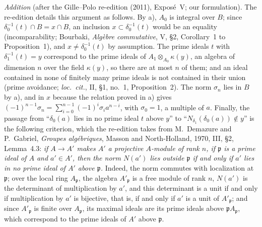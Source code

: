 \par\medskip\noindent
\emph{Addition} (after the Gille--Polo re-edition (2011), Exposé~V; our
formulation). The re-edition details this argument as follows. By a),
\(A_0\) is integral over \(B\); since \(\delta_0^{-1}(t)\cap B=x\cap B\), an
inclusion \(x\subset\delta_0^{-1}(t)\) would be an equality (incomparability;
Bourbaki, \emph{Algèbre commutative}, V, \S2, Corollary~1 to
Proposition~1), and \(x\neq\delta_0^{-1}(t)\) by assumption. The prime ideals
\(t\) with \(\delta_1^{-1}(t)=y\) correspond to the prime ideals of
\(A_1\otimes_{A_0}\kappa(y)\), an algebra of dimension \(n\) over the field
\(\kappa(y)\), so there are at most \(n\) of them; and an ideal contained in
none of finitely many prime ideals is not contained in their union (prime
avoidance; \emph{loc.\ cit.}, II, \S1, no.~1, Proposition~2). The norm
\(\sigma_n\) lies in \(B\) by a), and in \(x\) because the relation proved in
a) gives \((-1)^{n-1}\sigma_n=\sum_{i=0}^{n-1}(-1)^i\sigma_ia^{n-i}\), with
\(\sigma_0=1\), a multiple of \(a\). Finally, the passage from
``\(\delta_0(a)\) lies in no prime ideal \(t\) above \(y\)'' to
``\(N_{\delta_1}(\delta_0(a))\notin y\)'' is the following criterion, which the
re-edition takes from M.~Demazure and P.~Gabriel, \emph{Groupes
algébriques}, Masson and North-Holland, 1970, III, \S2, Lemma~4.3:
\emph{if \(A\to A'\) makes \(A'\) a projective \(A\)-module of rank \(n\), if
\(\mathfrak p\) is a prime ideal of \(A\) and \(a'\in A'\), then the norm
\(N(a')\) lies outside \(\mathfrak p\) if and only if \(a'\) lies in no prime
ideal of \(A'\) above \(\mathfrak p\).} Indeed, the norm commutes with
localization at \(\mathfrak p\); over the local ring \(A_{\mathfrak p}\), the
algebra \(A'_{\mathfrak p}\) is a free module of rank \(n\), \(N(a')\) is the
determinant of multiplication by \(a'\), and this determinant is a unit if
and only if multiplication by \(a'\) is bijective, that is, if and only if
\(a'\) is a unit of \(A'_{\mathfrak p}\); and since \(A'_{\mathfrak p}\) is finite
over \(A_{\mathfrak p}\), its maximal ideals are its prime ideals above
\(\mathfrak pA_{\mathfrak p}\), which correspond to the prime ideals of \(A'\)
above \(\mathfrak p\).
\par\medskip


